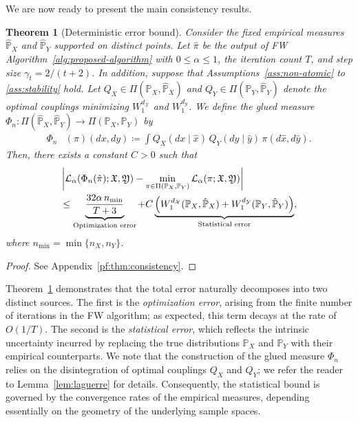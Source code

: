 \documentclass{article}
\theoremstyle{plain}
\newtheorem{theorem}{Theorem}[section]
\theoremstyle{definition}
\theoremstyle{remark}
\begin{document}
We are now ready to present the main consistency results. 
\begin{theorem}[Deterministic error bound]
	\label{thm:consistency}
	Consider the fixed empirical measures $\hat{\mathbb{P}}_X$ and $\hat{\mathbb{P}}_Y$ supported on distinct points. Let $\hat{\pi}$ be the output of FW Algorithm~\ref{alg:proposed-algorithm} with $0 \leq \alpha \leq 1$, the iteration count $T$, and step size $\gamma_t = 2/(t+2)$. In addition, suppose that Assumptions~\ref{ass:non-atomic} to \ref{ass:stability} hold.
	Let $Q_X \in \Pi(\mathbb{P}_X,\hat{\mathbb{P}}_X)$ and $Q_Y \in \Pi(\mathbb{P}_Y,\hat{\mathbb{P}}_Y)$ denote the optimal couplings minimizing $W_1^{d_{\mathcal{X}}}$ and $W_1^{d_{\mathcal{Y}}}$.
	We define the glued measure $\Phi_n: \Pi(\hat{\mathbb{P}}_X,\hat{\mathbb{P}}_Y) \to \Pi(\mathbb{P}_X,\mathbb{P}_Y)$ by
	\begin{align*}
		\Phi_n&(\pi)(dx,dy) \coloneqq \int Q_X(dx \mid \hat{x}) \, Q_Y(dy \mid \hat{y}) \, \pi(d\hat{x},d\hat{y}).
	\end{align*}
	Then, there exists a constant $C > 0$ such that
	\begin{align*}
		&\left\vert \mathcal{L}_{\alpha}(\Phi_n(\hat{\pi});\mathfrak{X},\mathfrak{Y}) - \min_{\pi \in \Pi(\mathbb{P}_X,\mathbb{P}_Y)} \mathcal{L}_{\alpha}(\pi;\mathfrak{X},\mathfrak{Y}) \right\vert \\
		&\leq \underbrace{\frac{32\alpha \, n_{\min}}{T+3}}_{\text{\rm Optimization error}} 
		+ C \underbrace{\left( W_1^{d_{\mathcal{X}}}(\mathbb{P}_X,\hat{\mathbb{P}}_X) + W_1^{d_{\mathcal{Y}}}(\mathbb{P}_Y,\hat{\mathbb{P}}_Y) \right)}_{\text{\rm Statistical error}},
	\end{align*}
	where $n_{\min} = \min\{n_X,n_Y\}$.
\end{theorem}
\begin{proof}
	See Appendix~\ref{pf:thm:consistency}.
\end{proof}

Theorem~\ref{thm:consistency} demonstrates that the total error naturally decomposes into two distinct sources. The first is the \textit{optimization error}, arising from the finite number of iterations in the FW algorithm; as expected, this term decays at the rate of $O(1/T)$. 
The second is the \textit{statistical error}, which reflects the intrinsic uncertainty incurred by replacing the true distributions $\mathbb{P}_X$ and $\mathbb{P}_Y$ with their empirical counterparts. We note that the construction of the glued measure $\Phi_n$ relies on the disintegration of optimal couplings $Q_X$ and $Q_Y$; we refer the reader to Lemma~\ref{lem:laguerre} for details. Consequently, the statistical bound is governed by the convergence rates of the empirical measures, depending essentially on the geometry of the underlying sample spaces.
\end{document}
